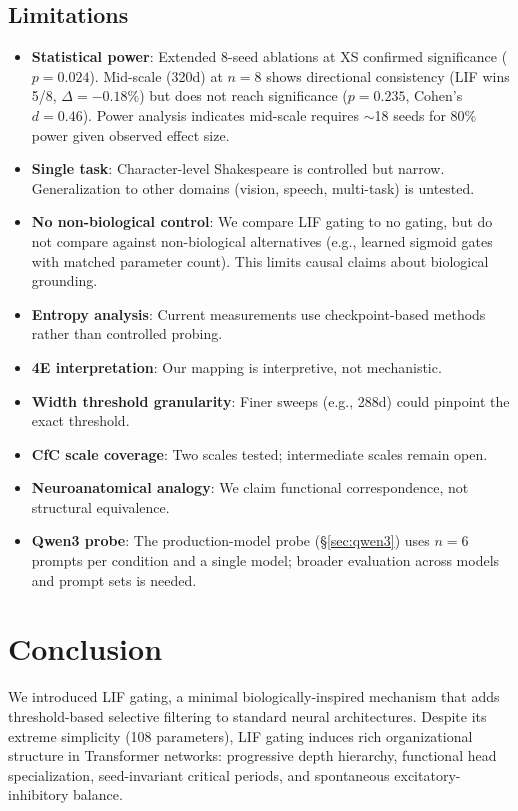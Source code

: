 \documentclass[11pt]{article}
\begin{document}
\subsection{Limitations}
\begin{itemize}
    \item \textbf{Statistical power}: Extended 8-seed ablations at XS confirmed significance ($p = 0.024$). Mid-scale (320d) at $n = 8$ shows directional consistency (LIF wins 5/8, $\Delta = -0.18\%$) but does not reach significance ($p = 0.235$, Cohen's $d = 0.46$). Power analysis indicates mid-scale requires $\sim$18 seeds for 80\% power given observed effect size.
    \item \textbf{Single task}: Character-level Shakespeare is controlled but narrow. Generalization to other domains (vision, speech, multi-task) is untested.
    \item \textbf{No non-biological control}: We compare LIF gating to no gating, but do not compare against non-biological alternatives (e.g., learned sigmoid gates with matched parameter count). This limits causal claims about biological grounding.
    \item \textbf{Entropy analysis}: Current measurements use checkpoint-based methods rather than controlled probing.
    \item \textbf{4E interpretation}: Our mapping is interpretive, not mechanistic.
    \item \textbf{Width threshold granularity}: Finer sweeps (e.g., 288d) could pinpoint the exact threshold.
    \item \textbf{CfC scale coverage}: Two scales tested; intermediate scales remain open.
    \item \textbf{Neuroanatomical analogy}: We claim functional correspondence, not structural equivalence.
    \item \textbf{Qwen3 probe}: The production-model probe (\S\ref{sec:qwen3}) uses $n = 6$ prompts per condition and a single model; broader evaluation across models and prompt sets is needed.
\end{itemize}


\section{Conclusion}

We introduced LIF gating, a minimal biologically-inspired mechanism that adds threshold-based selective filtering to standard neural architectures. Despite its extreme simplicity (108 parameters), LIF gating induces rich organizational structure in Transformer networks: progressive depth hierarchy, functional head specialization, seed-invariant critical periods, and spontaneous excitatory-inhibitory balance.
\end{document}
